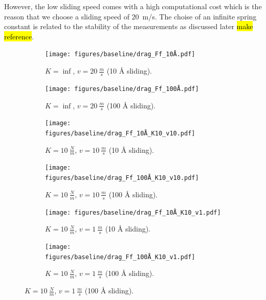 
However, the low sliding speed comes with a high computational cost which is the reason that we choose a sliding speed of \SI{20}{m/s}. The choise of an infinite spring constant is related to the stability of the measurements as discussed later \hl{make reference}.


\begin{figure}[H]
  \centering
  \begin{subfigure}[t]{0.49\textwidth}
      \centering
      \texttt{[image: figures/baseline/drag\_Ff\_10Å.pdf]}
      \caption{$K = \inf$, $v = \SI{20}{\frac{m}{s}}$ (10 Å sliding).}
      \label{fig:drag_Ff_10}
  \end{subfigure}
  \hfill
  \begin{subfigure}[t]{0.49\textwidth}
      \centering
      \texttt{[image: figures/baseline/drag\_Ff\_100Å.pdf]}
      \caption{$K = \inf$, $v = \SI{20}{\frac{m}{s}}$ (100 Å sliding).}
      \label{fig:drag_Ff_100}
    \end{subfigure}
    \hfill
    \begin{subfigure}[t]{0.49\textwidth}
      \centering
      \texttt{[image: figures/baseline/drag\_Ff\_10Å\_K10\_v10.pdf]}
      \caption{$K = \SI{10}{\frac{N}{m}}$, $v = \SI{10}{\frac{m}{s}}$ (10 Å sliding).}
      \label{fig:drag_Ff_10_K10_v10}
    \end{subfigure}
    \hfill
    \begin{subfigure}[t]{0.49\textwidth}
      \centering
      \texttt{[image: figures/baseline/drag\_Ff\_100Å\_K10\_v10.pdf]}
      \caption{$K = \SI{10}{\frac{N}{m}}$, $v = \SI{10}{\frac{m}{s}}$ (100 Å sliding).}
      \label{fig:drag_Ff_100_K10_v10}
  \end{subfigure}
  \hfill
    \begin{subfigure}[t]{0.49\textwidth}
      \centering
      \texttt{[image: figures/baseline/drag\_Ff\_10Å\_K10\_v1.pdf]}
      \caption{$K = \SI{10}{\frac{N}{m}}$, $v = \SI{1}{\frac{m}{s}}$ (10 Å sliding).}
      \label{fig:drag_Ff_10_K10_v1}
    \end{subfigure}
    \hfill
    \begin{subfigure}[t]{0.49\textwidth}
      \centering
      \texttt{[image: figures/baseline/drag\_Ff\_100Å\_K10\_v1.pdf]}
      \caption{$K = \SI{10}{\frac{N}{m}}$, $v = \SI{1}{\frac{m}{s}}$ (100 Å sliding).}
      \label{fig:drag_Ff_100_K10_v1}
  \end{subfigure}

\end{figure}
